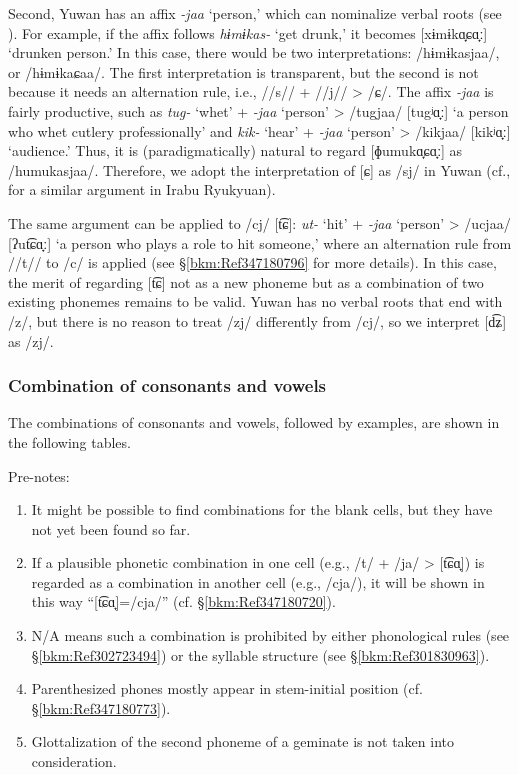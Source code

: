 Second, Yuwan has an affix \textit{{}-jaa} ‘person,’ which can nominalize verbal roots (see ). For example, if the affix follows \textit{hɨmɨkas-} ‘get drunk,’ it becomes [xɨmɨkɑ̟ɕɑ̟ː] ‘drunken person.’ In this case, there would be two interpretations:  /hɨmɨkasjaa/, or  /hɨmɨkaɕaa/. The first interpretation is transparent, but the second is not because it needs an alternation rule, i.e., //s// + //j// > /ɕ/. The affix \textit{{}-jaa} is fairly productive, such as \textit{tug-} ‘whet’ + \textit{{}-jaa} ‘person’ > /tugjaa/ [tugʲɑ̟ː] ‘a person who whet cutlery professionally’ and \textit{kik-} ‘hear’ + \textit{{}-jaa} ‘person’ > /kikjaa/ [kikʲɑ̟ː] ‘audience.’ Thus, it is (paradigmatically) natural to regard [ɸumukɑ̟ɕɑ̟ː] as /humukasjaa/. Therefore, we adopt the interpretation of [ɕ] as /sj/ in Yuwan (cf., \citet[79-81]{Shimoji2008} for a similar argument in Irabu Ryukyuan).

The same argument can be applied to /cj/ [t͡ɕ]: \textit{ut-} ‘hit’ + \textit{{}-jaa} ‘person’ > /ucjaa/ [ʔut͡ɕɑ̟ː] ‘a person who plays a role to hit someone,’ where an alternation rule from //t// to /c/ is applied (see §\ref{bkm:Ref347180796} for more details). In this case, the merit of regarding [t͡ɕ] not as a new phoneme but as a combination of two existing phonemes remains to be valid. Yuwan has no verbal roots that end with /z/, but there is no reason to treat /zj/ differently from /cj/, so we interpret [d͡ʑ] as /zj/.

\subsubsection{Combination of consonants and vowels}
\hypertarget{RefHeadingToc395696976}{}\label{bkm:Ref347177989}\label{bkm:Ref347180694}\label{bkm:Ref347181003}
The combinations of consonants and vowels, followed by examples, are shown in the following tables.

Pre-notes: 

\begin{enumerate}[label=\alph*.]
\item It might be possible to find combinations for the blank cells, but they have not yet been found so far.
\item If a plausible phonetic combination in one cell (e.g., /t/ + /ja/ > [t͡ɕɑ̟]) is regarded as a combination in another cell (e.g., /cja/), it will be shown in this way “[t͡ɕɑ̟]=/cja/” (cf. §\ref{bkm:Ref347180720}).
\item N/A means such a combination is prohibited by either phonological rules (see §\ref{bkm:Ref302723494}) or the syllable structure (see §\ref{bkm:Ref301830963}).
\item Parenthesized phones mostly appear in stem-initial position (cf. §\ref{bkm:Ref347180773}).
\item Glottalization of the second phoneme of a geminate is not taken into consideration.
\end{enumerate}

